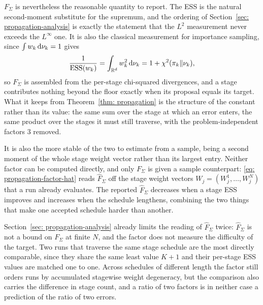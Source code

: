 \documentclass{article}
\begin{document}
$F_\Sigma$ is nevertheless the reasonable quantity to report. The ESS is the natural second-moment substitute for the supremum, and the ordering of Section~\ref{sec: propagation-analysis} is exactly the statement that the $L^2$ measurement never exceeds the $L^\infty$ one. It is also the classical measurement for importance sampling, since $\int w_k\,\mathrm{d}\nu_k=1$ gives
\begin{equation}
    \frac{1}{\mathrm{ESS}(w_k)} = \int_{\mathbb R^d} w_k^2\,\mathrm{d}\nu_k = 1 + \chi^2(\pi_k\|\nu_k) ,
    \label{eq: appendix-chisq}
\end{equation}
so $F_\Sigma$ is assembled from the per-stage chi-squared divergences, and a stage contributes nothing beyond the floor exactly when its proposal equals its target. What it keeps from Theorem~\ref{thm: propagation} is the structure of the constant rather than its value: the same sum over the stage at which an error enters, the same product over the stages it must still traverse, with the problem-independent factors $3$ removed.

It is also the more stable of the two to {\color{blue}estimate from a sample, being a second moment of the whole stage weight vector rather than its largest entry}. Neither factor can be computed directly, and {\color{blue}only $F_\Sigma$ is given a sample counterpart: \eqref{eq: propagation-factor-hat} reads $\hat F_\Sigma$ off} the stage weight vectors $W_j=(W_j^1,\dots,W_j^N)$ that a run already evaluates. The reported $\hat F_\Sigma$ decreases when a stage ESS improves and increases when the schedule lengthens, combining the two things that make one accepted schedule harder than another.

Section~\ref{sec: propagation-analysis} already limits the reading of $\hat F_\Sigma$ twice: $\hat F_\Sigma$ is not a bound on $F_\Sigma$ at finite $N$, and the factor does not measure the difficulty of the target. Two runs that traverse the same stage schedule are the most directly comparable, since they share the same least value $K+1$ and their per-stage ESS values are matched one to one. Across schedules of different length the factor still orders runs by accumulated stagewise weight degeneracy, but the comparison also carries the difference in stage count, and a ratio of two factors is in neither case a prediction of the ratio of two errors.
\end{document}
